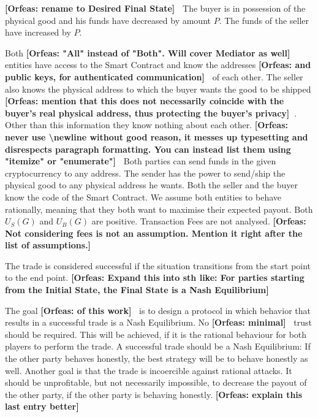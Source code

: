 \documentclass{cacthesis}
\newcommand{\authnote}[3]{{ \footnotesize \textbf{#1[#2: #3]~}}}
\newcommand{\orfnote}[1]{\authnote{\color{blue}}{Orfeas}{#1}}
\begin{document}
 \orfnote{rename to Desired Final State}
The buyer is in possession of the physical good and his funds have decreased by amount $P$. The funds of the seller have increased by $P$.

Both \orfnote{"All" instead of "Both". Will cover Mediator as well} entities
have access to the Smart Contract and know the addresses \orfnote{and public
keys, for authenticated communication} of each other. The seller also knows the
physical address to which the buyer wants the good to be shipped
\orfnote{mention that this does not necessarily coincide with the buyer's real
physical address, thus protecting the buyer's privacy}. Other than this
information they know nothing about each other.\orfnote{never use
\textbackslash{}newline without good reason, it messes up typesetting and
disrespects paragraph formatting. You can instead list them using
"itemize" or "enumerate"} \newline 
Both parties can send funds in the given cryptocurrency to any address. The sender has the power to send/ship the physical good to any physical address he wants. Both the seller and the buyer know the code of the Smart Contract.\newline
We assume both entities to behave rationally, meaning that they both want to maximise their expected payout.\newline
Both $U_S(G)$ and $U_B(G)$ are positive. \newline
Transaction Fees are not analysed. \orfnote{Not considering fees is not an
assumption. Mention it right after the list of assumptions.}

The trade is considered successful if the situation transitions from the start
point to the end point. \orfnote{Expand this into sth like: For parties starting
from the Initial State, the Final State is a Nash Equilibrium}

The goal \orfnote{of this work} is to design a protocol in which behavior that results in a successful trade is a Nash Equilibrium.\newline
No \orfnote{minimal} trust should be required. This will be achieved, if it is the rational behaviour for both players to perform the trade. A successful trade should be a Nash Equilibrium: If the other party behaves honestly, the best strategy will be to behave honestly as well.\newline
Another goal is that the trade is incoercible against rational attacks. It
should be unprofitable, but not necessarily impossible, to decrease the payout
of the other party, if the other party is behaving honestly. \orfnote{explain
this last entry better}
\end{document}
